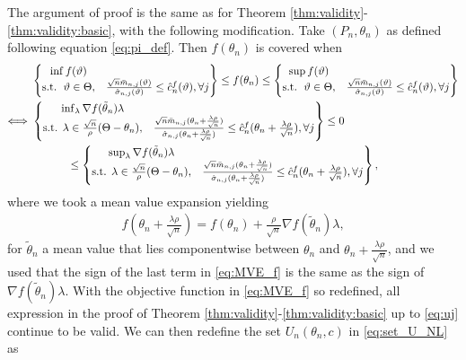 \documentclass[letterpaper,11pt]{article}
\theoremstyle{myplain}
\theoremstyle{mydefinition}
\theoremstyle{myremark}
\newcommand{\larhon}{\frac{\lambda \rho }{\sqrt n}}
\newcommand{\tlarhon}{\tfrac{\lambda \rho }{\sqrt n}}
\numberwithin{equation}{section}
\numberwithin{figure}{section}
\begin{document}
\begin{appendices}
The argument of proof is the same as for Theorem \ref{thm:validity}-\ref{thm:validity:basic}, with the following modification.
Take $(P_n,\theta_n)$ as defined following equation \eqref{eq:pi_def}. Then $f(\theta_n)$ is covered when
\begin{align*}
	 &~\begin{Bmatrix} \inf f(\vartheta)  &   \\ \text{s.t. } \, \vartheta \in \Theta, & \frac{\sqrt n \bar{m}_{n,j}(\vartheta)}{\hat\sigma_{n,j}(\vartheta)}\le  \hat{c}^f_n(\vartheta),  \forall j \end{Bmatrix} \le  f(\theta_n) \notag \le  \begin{Bmatrix} \sup f(\vartheta)  &   \\ \text{s.t. } \, \vartheta \in \Theta, & \frac{\sqrt n \bar{m}_{n,j}(\vartheta)}{\hat\sigma_{n,j}(\vartheta)}\le  \hat{c}^f_n(\vartheta), \forall j \end{Bmatrix}\\
	 \Longleftrightarrow &~ \begin{Bmatrix} \inf_{\lambda} \nabla f(\tilde{\theta}_n)\lambda  &   \\ \text{s.t. } \lambda\in \frac{\sqrt n}{\rho }(\Theta-\theta_n), & \frac{\sqrt n\bar{m}_{n,j}(\theta_n+\larhon)}{\hat\sigma_{n,j}(\theta_n+\larhon)}\le  \hat{c}^f_n(\theta_n+\larhon), \forall j \end{Bmatrix} \leq 0\notag\\
	 &\hspace{0.5in}\leq\begin{Bmatrix} \sup_{\lambda} \nabla f(\tilde{\theta}_n)\lambda  &   \\ \text{s.t. } \lambda\in \frac{\sqrt n}{\rho }(\Theta-\theta_n), & \frac{\sqrt n\bar{m}_{n,j}(\theta_n+\larhon)}{\hat\sigma_{n,j}(\theta_n+\larhon)}\le  \hat{c}^f_n(\theta_n+\larhon), \forall j \end{Bmatrix}, 
	 \end{align*}
where we took a mean value expansion yielding 
\begin{align}
f(\theta_n+\tlarhon)=f(\theta_n)+\frac{\rho }{\sqrt{n}} \nabla f(\tilde{\theta}_n)\lambda,\label{eq:MVE_f}
\end{align}	 
for $\tilde{\theta}_n$ a mean value that lies componentwise between $\theta_n$ and $\theta_n+\larhon$, and we used that the sign of the last term in \eqref{eq:MVE_f} is the same as the sign of $\nabla f(\tilde{\theta}_n)\lambda$. With the objective function in \eqref{eq:MVE_f} so redefined, all expression in the proof of Theorem \ref{thm:validity}-\ref{thm:validity:basic} up to \eqref{eq:uj} continue to be valid.
We can then redefine the set $U_n(\theta_n,c)$ in \eqref{eq:set_U_NL} as


\end{appendices}
\end{document}
